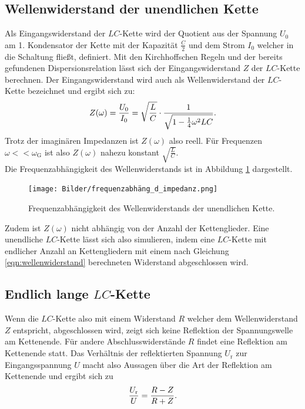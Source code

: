 \subsection{Wellenwiderstand der unendlichen Kette}
Als Eingangswiderstand der $LC$-Kette wird der Quotient aus der Spannung $U_{\mathrm{0}}$ am 1. Kondensator der Kette mit der Kapazität $\frac{C}{2}$ und dem Strom $I_{\mathrm{0}}$ welcher in die Schaltung fließt, definiert.
Mit den Kirchhoffschen Regeln und der bereits gefundenen Dispersionsrelation lässt sich der Eingangswiderstand $Z$ der $LC$-Kette berechnen.
Der Eingangswiderstand wird auch als Wellenwiderstand der $LC$-Kette bezeichnet und ergibt sich zu:
\begin{equation}
\centering
\label{eqn:wellenwiderstand}
Z(\omega)=\frac{U_{\mathrm{0}}}{I_{\mathrm{0}}}=\sqrt{\frac{L}{C}}\cdot \frac{1}{\sqrt{1-\frac{1}{4}\omega^2LC}}.
\end{equation}
Trotz der imaginären Impedanzen ist $Z(\omega)$ also reell.
Für Frequenzen $\omega<<\omega_{\mathrm{G}}$ ist also $Z(\omega)$ nahezu konstant $\sqrt{\frac{L}{C}}$.\\
Die Frequenzabhängigkeit des Wellenwiderstands ist in Abbildung \ref{fig:impedanz} dargestellt.
\begin{figure}
    \centering
\texttt{[image: Bilder/frequenzabhäng\_d\_impedanz.png]}
    \caption{Frequenzabhängigkeit des Wellenwiderstands der unendlichen Kette. \cite{Anleitung}}
    \label{fig:impedanz}
\end{figure}
Zudem ist $Z(\omega)$ nicht abhängig von der Anzahl der Kettenglieder. Eine unendliche $LC$-Kette lässt sich also simulieren, indem eine $LC$-Kette mit endlicher Anzahl an Kettengliedern mit einem nach Gleichung \eqref{eqn:wellenwiderstand} berechneten Widerstand abgeschlossen wird.

\subsection{Endlich lange $LC$-Kette}
Wenn die $LC$-Kette also mit einem Widerstand $R$ welcher dem Wellenwiderstand $Z$ entspricht, abgeschlossen wird, zeigt sich keine
Reflektion der Spannungswelle am Kettenende.
Für andere Abschlusswiderstände $R$ findet eine Reflektion am Kettenende statt.
Das Verhältnis der reflektierten Spannung $U_{\mathrm{r}}$ zur Eingangsspannung $U$ macht also Aussagen über die Art der Reflektion am Kettenende und ergibt sich zu
\begin{equation}
\centering
\label{eqn:abschluss}
\frac{U_{\mathrm{r}}}{U}=\frac{R-Z}{R+Z}.
\end{equation}

